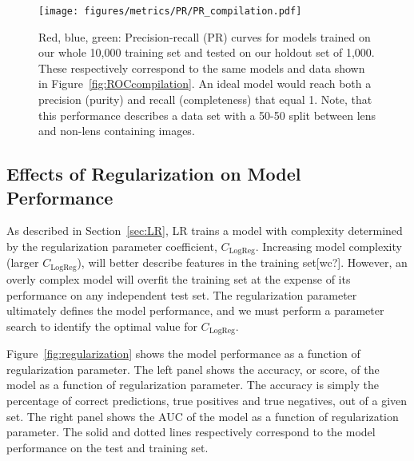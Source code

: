 \documentclass{emulateapj}
\begin{document}
\begin{figure}[t]\label{fig:PRcompilation}
\begin{center}
\texttt{[image: figures/metrics/PR/PR\_compilation.pdf]}
\caption{Red, blue, green: Precision-recall (PR) curves for models
  trained on our whole 10,000 training set and tested on our holdout
  set of 1,000.  These respectively correspond to the same models and
  data shown in Figure~\ref{fig:ROCcompilation}.  An ideal model would
  reach both a precision (purity) and recall (completeness) that equal
  1.  Note, that this performance describes a data set with a 50-50
  split between lens and non-lens containing images.}
\end{center}
\end{figure}

\subsection{Effects of Regularization on Model Performance}\label{sec:regularization}

As described in Section~\ref{sec:LR}, LR trains a model with
complexity determined by the regularization parameter coefficient,
$C_\text{LogReg}$.  Increasing model complexity (larger
$C_\text{LogReg}$), will better describe features in the training
set[wc?].  However, an overly complex model will overfit the training
set at the expense of its performance on any independent test set.
The regularization parameter ultimately defines the model performance,
and we must perform a parameter search to identify the optimal value
for $C_\text{LogReg}$.

Figure~\ref{fig:regularization} shows the model performance as a
function of regularization parameter.  The left panel shows the
accuracy, or score, of the model as a function of regularization
parameter.  The accuracy is simply the percentage of correct
predictions, true positives and true negatives, out of a given set.
The right panel shows the AUC of the model as a function of
regularization parameter.  The solid and dotted lines respectively
correspond to the model performance on the test and training set.
\end{document}
